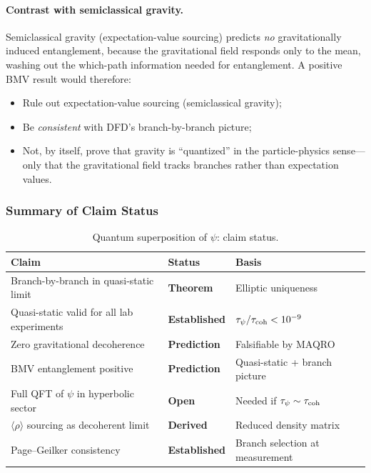 \paragraph{Contrast with semiclassical gravity.}
Semiclassical gravity (expectation-value sourcing) predicts \emph{no} gravitationally induced entanglement, because the gravitational field responds only to the mean, washing out the which-path information needed for entanglement.  A positive BMV result would therefore:
\begin{itemize}
\item Rule out expectation-value sourcing (semiclassical gravity);
\item Be \emph{consistent} with DFD's branch-by-branch picture;
\item Not, by itself, prove that gravity is ``quantized'' in the particle-physics sense---only that the gravitational field tracks branches rather than expectation values.
\end{itemize}

\subsubsection{Summary of Claim Status}

\begin{table}[h]
\centering
\caption{Quantum superposition of $\psi$: claim status.}\label{tab:quantum-psi-status}
\begin{ruledtabular}
\begin{tabular}{lll}
\textbf{Claim} & \textbf{Status} & \textbf{Basis} \\
\hline
Branch-by-branch in quasi-static limit & \textbf{Theorem} & Elliptic uniqueness \\
Quasi-static valid for all lab experiments & \textbf{Established} & $\tau_\psi/\tau_{\rm coh} < 10^{-9}$ \\
Zero gravitational decoherence & \textbf{Prediction} & Falsifiable by MAQRO \\
BMV entanglement positive & \textbf{Prediction} & Quasi-static + branch picture \\
Full QFT of $\psi$ in hyperbolic sector & \textbf{Open} & Needed if $\tau_\psi \sim \tau_{\rm coh}$ \\
$\langle\rho\rangle$ sourcing as decoherent limit & \textbf{Derived} & Reduced density matrix \\
Page--Geilker consistency & \textbf{Established} & Branch selection at measurement \\
\end{tabular}
\end{ruledtabular}
\end{table}

